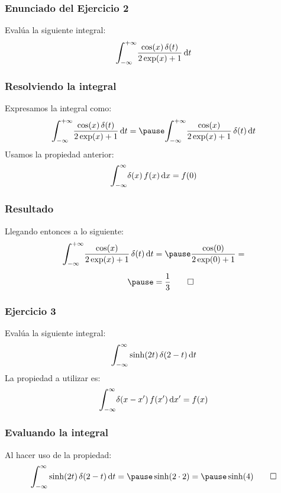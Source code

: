 \documentclass[12pt]{beamer}
\begin{document}
\begin{frame}
\frametitle{Enunciado del Ejercicio 2}
Evalúa la siguiente integral:
\pause
\begin{align*}
\scaleint{6ex}_{\bs -\infty}^{+\infty} \dfrac{\cos (x) \, \delta (t)}{2 \exp(x) + 1}  \dd{t}
\end{align*}
\end{frame}

\begin{frame}
\frametitle{Resolviendo la integral}
Expresamos la integral como:
\pause
\begin{eqnarray*}
\begin{aligned}
\scaleint{6ex}_{\bs -\infty}^{+\infty} \dfrac{\cos (x) \, \delta (t)}{2 \exp(x) + 1} \dd{t} = \pause  
\scaleint{6ex}_{\bs -\infty}^{+\infty} \dfrac{\cos (x)}{2 \exp(x) + 1} \, \delta (t) \dd{t}
\end{aligned}
\end{eqnarray*}
\pause
Usamos la propiedad anterior:
\begin{align*}
\scaleint{6ex}_{\bs -\infty}^{\infty} \delta (x) \, f (x) \dd{x} = f (0)
\end{align*}
\end{frame}

\begin{frame}
\frametitle{Resultado}
Llegando entonces a lo siguiente:
\pause
\begin{eqnarray*}
\begin{aligned}
\scaleint{6ex}_{\bs -\infty}^{+\infty} \dfrac{\cos (x)}{2 \exp(x) + 1} \, \delta (t) \dd{t} &= \pause \dfrac{\cos (0)}{2 \exp (0) + 1} = \\[0.5em] \pause
&= \dfrac{1}{3} \qed
\end{aligned}
\end{eqnarray*}
\end{frame}

\begin{frame}
\frametitle{Ejercicio 3}
Evalúa la siguiente integral:
\pause
\begin{align*}
\scaleint{6ex}_{\bs -\infty}^{\infty} \sinh (2 t) \, \delta (2 - t) \dd{t}
\end{align*}
\pause
La propiedad a utilizar es:
\pause
\begin{align*}
\scaleint{6ex}_{\bs -\infty}^{\infty} \delta (x - \pderivada{x}) \, f (\pderivada{x}) \dd{\pderivada{x}} = f (x)
\end{align*}
\end{frame}

\begin{frame}
\frametitle{Evaluando la integral}
Al hacer uso de la propiedad:
\pause
\begin{eqnarray*}
\begin{aligned}
\scaleint{6ex}_{\bs -\infty}^{\infty} \sinh (2 t) \, \delta (2 - t) \dd{t} = \pause \sinh (2 \cdot 2) = \pause \sinh (4) \qed
\end{aligned}
\end{eqnarray*}
\end{frame}
\end{document}

